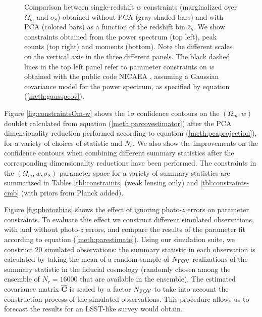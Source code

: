 \documentclass[reprint,aps,prd,superscriptaddress,showkeys,showpacs]{revtex4-1}
\newcommand{\bbh}[1]{\mathbf{\hat{#1}}}
\begin{document}
\begin{figure}
\caption{Comparison between single-redshift $w$ constraints (marginalized over $\Omega_m$ and $\sigma_8$) obtained without PCA (gray shaded bars) and with PCA (colored bars) as a function of the redshift bin $\bar{z}_b$. We show constraints obtained from the power spectrum (top left), peak counts (top right) and moments (bottom). Note the different scales on the vertical axis in the three different panels. The black dashed lines in the top left panel refer to parameter constraints on $w$ obtained with the public code NICAEA \citep{Nicaea}, assuming a Gaussian covariance model for the power spectrum, as specified by equation (\ref{meth:gausspcov}).}
\label{fig:nopca}
\end{figure}

Figure \ref{fig:constraintsOm-w} shows the $1\sigma$ confidence contours on the $(\Omega_m,w)$ doublet calculated from equation (\ref{meth:parcovestimator}) after the PCA dimensionality reduction performed according to equation (\ref{meth:pcaprojection}), for a variety of choices of statistic and $N_c$. We also show the improvements on the confidence contours when combining different summary statistics after the corresponding dimensionality reductions have been performed. The constraints in the $(\Omega_m,w,\sigma_8)$ parameter space for a variety of summary statistics are summarized in Tables \ref{tbl:constraints} (weak lensing only) and \ref{tbl:constraints-cmb} (with priors from Planck added). 

Figure \ref{fig:photozbias} shows the effect of ignoring photo-$z$ errors on parameter constraints. To evaluate this effect we construct different simulated observations, with and without photo-$z$ errors, and compare the results of the parameter fit according to equation (\ref{meth:parestimate}). Using our simulation suite, we construct 20 simulated observations: the summary statistic in each observation is calculated by taking the mean of a random sample of $N_{\rm FOV}$ realizations of the summary statistic in the fiducial cosmology (randomly chosen among the ensemble of $N_r=16000$ that are available in the ensemble). The estimated covariance matrix $\bbh{C}$ is scaled by a factor $N_{\rm FOV}$ to take into account the construction process of the simulated observations. This procedure allows us to forecast the results for an LSST-like survey would obtain.        
\end{document}
